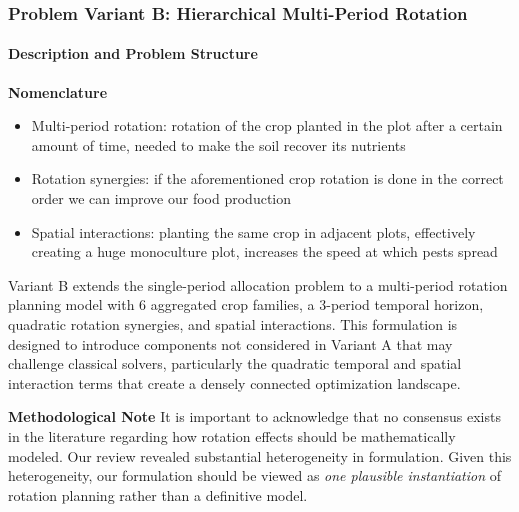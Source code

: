 \documentclass{oqireport}
\begin{document}


\subsubsection{Problem Variant B: Hierarchical Multi-Period Rotation}
\label{subsec:formulation_b}

\paragraph{Description and Problem Structure}

\textbf{Nomenclature}
\begin{itemize}
    \item Multi-period rotation: rotation of the crop planted in the plot after a certain amount of time, needed to make the soil recover its nutrients
    \item Rotation synergies: if the aforementioned crop rotation is done in the correct order we can improve our food production
    \item Spatial interactions: planting the same crop in adjacent plots, effectively creating a huge monoculture plot, increases the speed at which pests spread
\end{itemize}

Variant B extends the single-period allocation problem to a multi-period rotation planning model with 6 aggregated crop families, a 3-period temporal horizon, quadratic rotation synergies, and spatial interactions. This formulation is designed to introduce components not considered in Variant A that may challenge classical solvers, particularly the quadratic temporal and spatial interaction terms that create a densely connected optimization landscape.

\textbf{Methodological Note}
It is important to acknowledge that no consensus exists in the literature regarding how rotation effects should be mathematically modeled. Our review revealed substantial heterogeneity in formulation. Given this heterogeneity, our formulation should be viewed as \emph{one plausible instantiation} of rotation planning rather than a definitive model.
\end{document}
